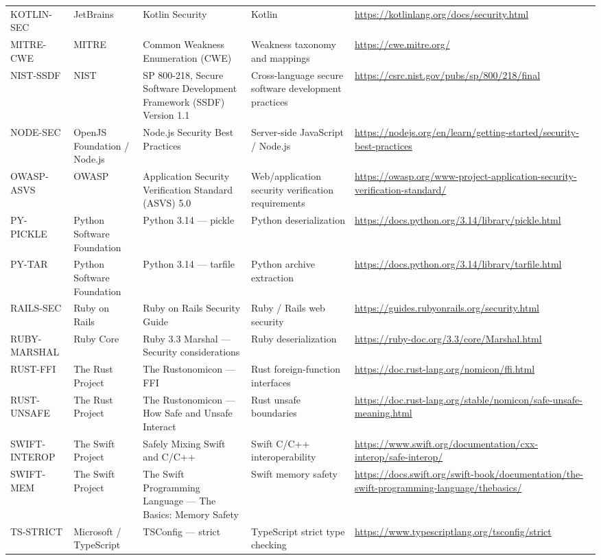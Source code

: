 \documentclass[10pt,letterpaper]{article}
\begin{document}
\begin{landscape}
\begin{longtable}{@{}P{0.82in}P{1.23in}P{2.25in}P{1.7in}P{3.0in}@{}}
KOTLIN-SEC & JetBrains & Kotlin Security & Kotlin & \url{https://kotlinlang.org/docs/security.html}\\
MITRE-CWE & MITRE & Common Weakness Enumeration (CWE) & Weakness taxonomy and mappings & \url{https://cwe.mitre.org/}\\
NIST-SSDF & NIST & SP 800-218, Secure Software Development Framework (SSDF) Version 1.1 & Cross-language secure software development practices & \url{https://csrc.nist.gov/pubs/sp/800/218/final}\\
NODE-SEC & OpenJS Foundation / Node.js & Node.js Security Best Practices & Server-side JavaScript / Node.js & \url{https://nodejs.org/en/learn/getting-started/security-best-practices}\\
OWASP-ASVS & OWASP & Application Security Verification Standard (ASVS) 5.0 & Web/application security verification requirements & \url{https://owasp.org/www-project-application-security-verification-standard/}\\
PY-PICKLE & Python Software Foundation & Python 3.14 --- pickle & Python deserialization & \url{https://docs.python.org/3.14/library/pickle.html}\\
PY-TAR & Python Software Foundation & Python 3.14 --- tarfile & Python archive extraction & \url{https://docs.python.org/3.14/library/tarfile.html}\\
RAILS-SEC & Ruby on Rails & Ruby on Rails Security Guide & Ruby / Rails web security & \url{https://guides.rubyonrails.org/security.html}\\
RUBY-MARSHAL & Ruby Core & Ruby 3.3 Marshal --- Security considerations & Ruby deserialization & \url{https://ruby-doc.org/3.3/core/Marshal.html}\\
RUST-FFI & The Rust Project & The Rustonomicon --- FFI & Rust foreign-function interfaces & \url{https://doc.rust-lang.org/nomicon/ffi.html}\\
RUST-UNSAFE & The Rust Project & The Rustonomicon --- How Safe and Unsafe Interact & Rust unsafe boundaries & \url{https://doc.rust-lang.org/stable/nomicon/safe-unsafe-meaning.html}\\
SWIFT-INTEROP & The Swift Project & Safely Mixing Swift and C/C++ & Swift C/C++ interoperability & \url{https://www.swift.org/documentation/cxx-interop/safe-interop/}\\
SWIFT-MEM & The Swift Project & The Swift Programming Language --- The Basics: Memory Safety & Swift memory safety & \url{https://docs.swift.org/swift-book/documentation/the-swift-programming-language/thebasics/}\\
TS-STRICT & Microsoft / TypeScript & TSConfig --- strict & TypeScript strict type checking & \url{https://www.typescriptlang.org/tsconfig/strict}\\
\bottomrule
\end{longtable}
\normalsize
\end{landscape}
\end{document}
